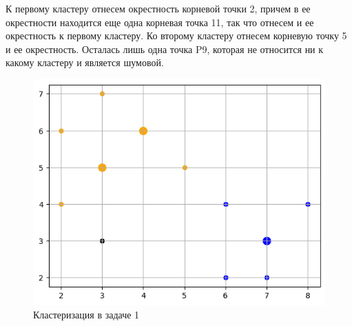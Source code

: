 К первому кластеру отнесем окрестность корневой точки 2, причем в ее окрестности находится еще одна корневая точка 11, так что отнесем и ее окрестность к первому кластеру. Ко второму кластеру отнесем корневую точку 5 и ее окрестность. Осталась лишь одна точка P9, которая не относится ни к какому кластеру и является шумовой.
\begin{figure}[h!]
    \centering
    \includegraphics[width=0.7\linewidth]{png/task1dbs_plot.png}
    \caption{Кластеризация в задаче 1}
    \label{fig:task1dbs}
\end{figure}

